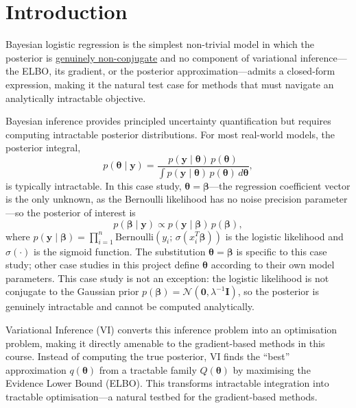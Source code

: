\documentclass[11pt,a4paper]{article}
\newcommand{\N}{\mathcal{N}}
\begin{document}
\section*{Introduction}

Bayesian logistic regression is the simplest non-trivial model in which the posterior is
\underline{genuinely non-conjugate} and no component of variational inference---the ELBO, its gradient,
or the posterior approximation---admits a closed-form expression, making it the natural
test case for methods that must navigate an analytically intractable objective.

Bayesian inference provides principled uncertainty quantification but requires computing
intractable posterior distributions. For most real-world models, the posterior integral,
\begin{equation*}
  p(\bm{\theta} \mid \bm{y}) = \frac{p(\bm{y} \mid \bm{\theta})\,p(\bm{\theta})}
    {\displaystyle\int p(\bm{y} \mid \bm{\theta})\,p(\bm{\theta})\,d\bm{\theta}},
\end{equation*}
is typically intractable.
In this case study, $\bm{\theta} = \bm{\beta}$---the regression coefficient vector is
the only unknown, as the Bernoulli likelihood has no noise precision parameter---so the
posterior of interest is
\begin{equation*}
  p(\bm{\beta} \mid \bm{y}) \propto p(\bm{y} \mid \bm{\beta})\,p(\bm{\beta}),
\end{equation*}
where $p(\bm{y} \mid \bm{\beta}) = \prod_{i=1}^{n} \mathrm{Bernoulli}(y_i;\,\sigma(x_i^T\bm{\beta}))$
is the logistic likelihood and $\sigma(\cdot)$ is the sigmoid function.
The substitution $\bm{\theta} = \bm{\beta}$ is specific to this case study;
other case studies in this project define $\bm{\theta}$ according to their own model
parameters.
This case study is not an exception: the logistic likelihood is not conjugate to the
Gaussian prior $p(\bm{\beta})=\N(\bm{0}, \lambda^{-1}\bm{I})$, so the posterior
is genuinely intractable and cannot be computed analytically.

Variational Inference (VI) converts this inference problem into an optimisation problem,
making it directly amenable to the gradient-based methods in this course.
Instead of computing the true posterior, VI finds the ``best'' approximation $q(\bm{\theta})$
from a tractable family $Q(\bm{\theta})$ by maximising the Evidence Lower Bound (ELBO).
This transforms intractable integration into tractable optimisation---a natural testbed for
the gradient-based methods.
\end{document}
